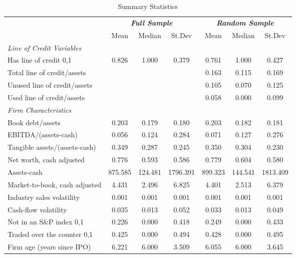 \def\sym#1{\ifmmode^{#1}\else\(^{#1}\)\fi}

\begin{table}[htbp]
    \centering
    \caption{Summary Statistics}
    \begin{tabular}{l*{3}{c}*{3}{c}}
    \toprule
                    &\multicolumn{3}{c}{\textbf{\emph{Full Sample}}} & \multicolumn{3}{c}{\textbf{\emph{Random Sample}}} \\
                    & \multicolumn{1}{c}{{Mean}} & \multicolumn{1}{c}{{Median}} & \multicolumn{1}{c}{{St.Dev}} & 
                     \multicolumn{1}{c}{{Mean}} & \multicolumn{1}{c}{{Median}} & \multicolumn{1}{c}{{St.Dev}} \\
    \midrule
    \textit{Line of Credit Variables} & & & & & & \\
    Has line of credit {0,1}          & 0.826  & 1.000 & 0.379 & 0.761  & 1.000 & 0.427 \\
    Total line of credit/assets       &        &       &       & 0.163  & 0.115 & 0.169 \\
    Unused line of credit/assets      &        &       &       & 0.105  & 0.070 & 0.125 \\
    Used line of credit/assets        &        &       &       & 0.058  & 0.000 & 0.099 \\
    \textit{Firm Characteristics}     &       &      &      &       &      &      \\
    Book debt/assets                  & 0.203  & 0.179 & 0.180 & 0.203  & 0.182 & 0.181 \\
    EBITDA/(assets-cash)              & 0.056  & 0.124 & 0.284 & 0.071  & 0.127 & 0.276 \\
    Tangible assets/(assets-cash)     & 0.349  & 0.287 & 0.245 & 0.350  & 0.304 & 0.230 \\
    Net worth, cash adjusted          & 0.776  & 0.593 & 0.586 & 0.779  & 0.604 & 0.580 \\
    Assets-cash                       & 875.585 & 124.481 & 1796.391 & 899.323 & 144.541 & 1813.409 \\
    Market-to-book, cash adjusted     & 4.431  & 2.496 & 6.825 & 4.401  & 2.513 & 6.379 \\
    Industry sales volatility         & 0.001  & 0.001 & 0.001 & 0.001  & 0.001 & 0.001 \\
    Cash-flow volatility              & 0.035  & 0.013 & 0.052 & 0.033  & 0.013 & 0.049 \\
    Not in an S\&P index {0,1}        & 0.226  & 0.000 & 0.418 & 0.249  & 0.000 & 0.433 \\
    Traded over the counter {0,1}     & 0.425  & 0.000 & 0.494 & 0.428  & 0.000 & 0.495 \\
    Firm age (years since IPO)        & 6.221  & 6.000 & 3.509 & 6.055  & 6.000 & 3.645 \\
    \bottomrule
    \end{tabular}
\end{table}